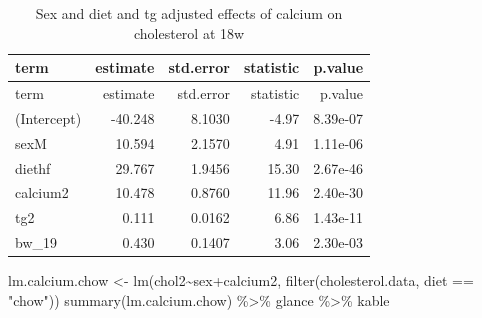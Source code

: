 \documentclass[
]{article}
\newenvironment{Shaded}{\begin{snugshade}}{\end{snugshade}}
\newcommand{\FunctionTok}[1]{\textcolor[rgb]{0.00,0.00,0.00}{#1}}
\newcommand{\NormalTok}[1]{#1}
\newcommand{\OtherTok}[1]{\textcolor[rgb]{0.56,0.35,0.01}{#1}}
\newcommand{\SpecialCharTok}[1]{\textcolor[rgb]{0.00,0.00,0.00}{#1}}
\newcommand{\StringTok}[1]{\textcolor[rgb]{0.31,0.60,0.02}{#1}}
\begin{document}
\begin{longtable}[]{@{}lrrrr@{}}
\caption{Sex and diet and tg adjusted effects of calcium on cholesterol
at 18w}\tabularnewline
\toprule()
term & estimate & std.error & statistic & p.value \\
\midrule()
\endfirsthead
\toprule()
term & estimate & std.error & statistic & p.value \\
\midrule()
\endhead
(Intercept) & -40.248 & 8.1030 & -4.97 & 8.39e-07 \\
sexM & 10.594 & 2.1570 & 4.91 & 1.11e-06 \\
diethf & 29.767 & 1.9456 & 15.30 & 2.67e-46 \\
calcium2 & 10.478 & 0.8760 & 11.96 & 2.40e-30 \\
tg2 & 0.111 & 0.0162 & 6.86 & 1.43e-11 \\
bw\_19 & 0.430 & 0.1407 & 3.06 & 2.30e-03 \\
\bottomrule()
\end{longtable}

\begin{Shaded}
\begin{Highlighting}[]
\NormalTok{lm.calcium.chow }\OtherTok{\textless{}{-}} \FunctionTok{lm}\NormalTok{(chol2}\SpecialCharTok{\textasciitilde{}}\NormalTok{sex}\SpecialCharTok{+}\NormalTok{calcium2, }\FunctionTok{filter}\NormalTok{(cholesterol.data, diet }\SpecialCharTok{==} \StringTok{"chow"}\NormalTok{))}
\FunctionTok{summary}\NormalTok{(lm.calcium.chow) }\SpecialCharTok{\%\textgreater{}\%}\NormalTok{ glance }\SpecialCharTok{\%\textgreater{}\%}\NormalTok{ kable}
\end{Highlighting}
\end{Shaded}
\end{document}
